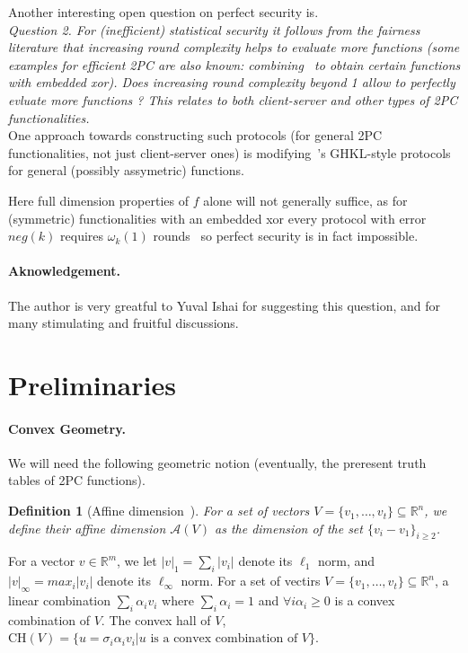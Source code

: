 \documentclass[a4paper]{article}
\newtheorem{definition}{Definition}[section]
\newcommand{\R}{\mathbb{R}}
\newcommand{\affine}[1]{\mathcal{A}(#1)}
\newcommand{\CH}[1]{\text{CH}(#1)}
\begin{document}

Another interesting open question on perfect security is.\\ 

\emph{Question 2. For (inefficient) statistical security it follows from the fairness literature that increasing round complexity helps to evaluate more functions (some examples for efficient 2PC are also known: combining~\cite{Ash14,GHKL08} to obtain certain functions with embedded xor).
Does increasing round complexity beyond 1 allow to perfectly evluate more functions ? This relates to both client-server and other types of 2PC functionalities.} \\

One approach towards constructing such protocols (for general 2PC functionalities, not just client-server ones) is modifying~\cite{Ash14}'s GHKL-style protocols for general (possibly assymetric) functions. 

Here full dimension properties of $f$ alone will not generally suffice, as for (symmetric) functionalities with an embedded xor every protocol with error $neg(k)$ requires $\omega_k(1)$ rounds~\cite{GHKL08} so perfect security is in fact impossible.

\paragraph{Aknowledgement.}

The author is very greatful to Yuval Ishai for suggesting this question, and for many stimulating and fruitful discussions. 

\section{Preliminaries}

\paragraph{Convex Geometry.} We will need the following geometric notion (eventually, the preresent truth tables of 2PC functions).
\begin{definition}[Affine dimension~\cite{Ash14}]
	For a set of vectors $V=\{v_1,\ldots,v_t\}\subseteq\R^n$, we define their affine dimension $\affine{V}$ as the dimension of the set
	$\{v_i-v_1\}_{i\geq 2}$. 
\end{definition}
For a vector $v\in \R^m$, 
we let $|v|_1=\sum_i|v_i|$ denote its $\ell_1$ norm, and $|v|_\infty=max_i |v_i|$ denote its $\ell_\infty$ norm.
For a set of vectirs $V=\{v_1,\ldots,v_t\}\subseteq\R^n$, a linear combination $\sum_i \alpha_iv_i$ where $\sum_i\alpha_i=1$ and $\forall i\alpha_i\geq 0$ is a convex combination of $V$. The convex hall of $V$,
$\CH{V}=\{u=\sigma_i\alpha_iv_i|u\text{ is a convex combination of }V\}$.
\end{document}
